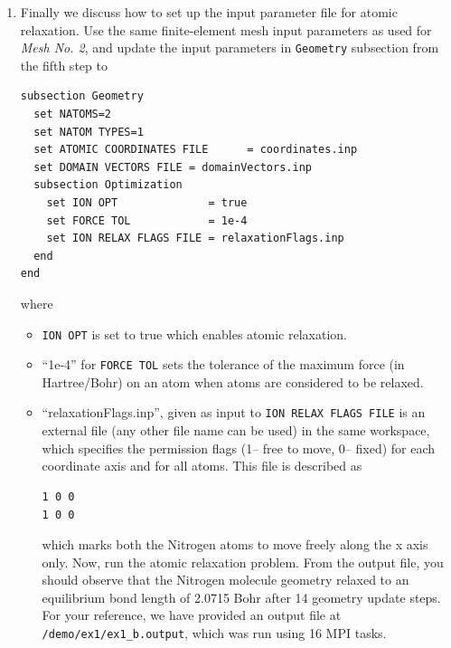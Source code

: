 \begin{enumerate}
\item Finally we discuss how to set up the input parameter file for atomic relaxation. 
Use the same finite-element mesh input parameters as used for \emph{Mesh No. 2}, and update the 
input parameters in \verb|Geometry| subsection from the fifth step to
\begin{verbatim}
subsection Geometry
  set NATOMS=2
  set NATOM TYPES=1
  set ATOMIC COORDINATES FILE      = coordinates.inp 
  set DOMAIN VECTORS FILE = domainVectors.inp
  subsection Optimization
    set ION OPT              = true
    set FORCE TOL            = 1e-4    
    set ION RELAX FLAGS FILE = relaxationFlags.inp
  end
end
\end{verbatim}
where
\begin{itemize}
\item \verb|ION OPT| is set to true which enables atomic relaxation.  		
\item ``1e-4'' for \verb|FORCE TOL| sets the tolerance of the maximum force (in Hartree/Bohr) on an atom when atoms are
considered to be relaxed.
\item ``relaxationFlags.inp'', given as input to \verb|ION RELAX FLAGS FILE| is an external file (any other file name can be used) in the same workspace, which specifies the permission flags (1-- free to move, 0-- fixed) for each coordinate axis and for all atoms. This file is described as 
\begin{verbatim}
1 0 0
1 0 0
\end{verbatim}
which marks both the Nitrogen atoms to move freely along the x axis only.
Now, run the atomic relaxation problem. From the output file, you should observe that the Nitrogen molecule geometry relaxed to
an equilibrium bond length of 2.0715 Bohr after 14 geometry update steps.  For your reference, we have provided an output file at \verb|/demo/ex1/ex1_b.output|, which was run using 16 MPI tasks.
\end{itemize}
\end{enumerate}

